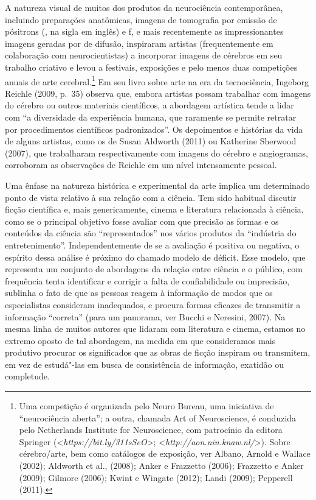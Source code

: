A natureza visual de muitos dos produtos da neurociência contemporânea,
incluindo preparações anatômicas, imagens de tomografia por emissão de
pósitrons (, na sigla em inglês) e f, e mais recentemente as
impressionantes imagens geradas por  de difusão, inspiraram artistas
(frequentemente em colaboração com neurocientistas) a incorporar imagens
de cérebros em seu trabalho criativo e levou a festivais, exposições e
pelo menos duas competições anuais de arte cerebral.\footnote[1]{Uma competição é organizada pelo Neuro Bureau, uma iniciativa de
``neurociência aberta''; a outra, chamada Art of Neuroscience, é
conduzida pelo Netherlands Institute for Neuroscience, com patrocínio da
editora Springer
(\textless{}\emph{https://bit.ly/311sSeO}\textgreater{};
\textless{}\emph{http://aon.nin.knaw.nl/}\textgreater{}). Sobre cérebro/arte, bem como catálogos
de exposição, ver Albano, Arnold e Wallace (2002); Aldworth et al.,
(2008); Anker e Frazzetto (2006); Frazzetto e Anker (2009); Gilmore
(2006); Kwint e Wingate (2012); Landi (2009); Pepperell (2011).}
Em seu livro sobre arte na era da tecnociência, Ingeborg Reichle (2009,
p.~35) observa que, embora artistas possam trabalhar com imagens do
cérebro ou outros materiais científicos, a abordagem artística tende a
lidar com ``a diversidade da experiência humana, que raramente se
permite retratar por procedimentos científicos padronizados''. Os
depoimentos e histórias da vida de alguns artistas, como os de Susan
Aldworth (2011) ou Katherine Sherwood (2007), que trabalharam
respectivamente com imagens do cérebro e angiogramas, corroboram as
observações de Reichle em um nível intensamente pessoal.

Uma ênfase na natureza histórica e experimental da arte implica um
determinado ponto de vista relativo à sua relação com a ciência. Tem
sido habitual discutir ficção científica e, mais genericamente, cinema e
literatura relacionada à ciência, como se o principal objetivo fosse
avaliar com que precisão as formas e os conteúdos da ciência são
``representados'' nos vários produtos da ``indústria do
entretenimento''. Independentemente de se a avaliação é positiva ou
negativa, o espírito dessa análise é próximo do chamado modelo de
déficit. Esse modelo, que representa um conjunto de abordagens da
relação entre ciência e o público, com frequência tenta identificar e
corrigir a falta de confiabilidade ou imprecisão, sublinha o fato de que
as pessoas reagem à informação de modos que os especialistas consideram
inadequados, e procura formas eficazes de transmitir a informação
``correta'' (para um panorama, ver Bucchi e Neresini, 2007). Na mesma
linha de muitos autores que lidaram com literatura e cinema, estamos no
extremo oposto de tal abordagem, na medida em que consideramos mais
produtivo procurar os significados que as obras de ficção inspiram ou
transmitem, em vez de estudá"-las em busca de consistência de informação,
exatidão ou completude.

